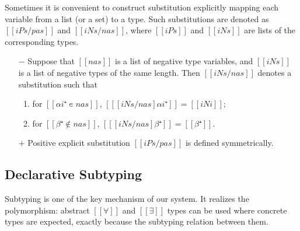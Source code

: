 \documentclass[a4,natbib=false]{article}
\begin{document}
Sometimes it is convenient to construct substitution 
explicitly mapping each variable from a list (or a set)
to a type. Such substitutions are denoted as $[[iPs / pas]]$
and $[[iNs / nas]]$, where $[[iPs]]$ and $[[iNs]]$ are lists of 
the corresponding types.
\begin{definition}
  \hfill
  \begin{itemize}
    \item [$-$]
      Suppose that $[[nas]]$ is a list of negative type variables,
      and $[[iNs]]$ is a list of negative types of the same length.
      Then $[[iNs / nas]]$ denotes a substitution such that 
      \begin{enumerate}
        \item for $[[αi⁺ ∊ {nas}]]$, $[[ [iNs / nas] αi⁺]] = [[iNi]]$;
        \item for $[[β⁺ ∉ {nas}]]$, $[[ [iNs / nas] β⁺]] = [[β⁺]]$.
      \end{enumerate}
    \item [$+$]
      Positive explicit substitution $[[iPs / pas]]$
      is defined symmetrically.
  \end{itemize}
\end{definition}


\subsection{Declarative Subtyping}
Subtyping is one of the key mechanism of our system. 
It realizes the polymorphism: abstract $[[∀]]$ and 
$[[∃]]$ types can be used where concrete types are expected,
exactly because the subtyping relation between them.


\begin{definition} 
  \label{def:subDOne}
  \hfill
  
  \begin{multicols}{2}
    \ottdefnDOneNsub{}
    \columnbreak\\
    \ottdefnDOnePsup{}
  \end{multicols}
  
  \begin{multicols}{2}
    \ottdefnDOneNeq{}
    \columnbreak\\
    \ottdefnDOnePeq{}
  \end{multicols}
\end{definition}
\end{document}
